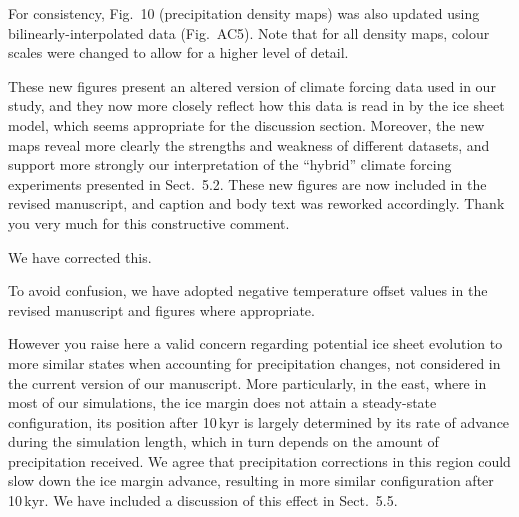 \documentclass[10pt]{article}
\begin{document}
For consistency, Fig.~10 (precipitation density maps) was also updated using bilinearly-interpolated data (Fig.~AC5). Note that for all density maps, colour scales were changed to allow for a higher level of detail.

These new figures present an altered version of climate forcing data used in our study, and they now more closely reflect how this data is read in by the ice sheet model, which seems appropriate for the discussion section. Moreover, the new maps reveal more clearly the strengths and weakness of different datasets, and support more strongly our interpretation of the ``hybrid'' climate forcing experiments presented in Sect.~5.2. These new figures are now included in the revised manuscript, and caption and body text was reworked accordingly. Thank you very much for this constructive comment.


We have corrected this.


To avoid confusion, we have adopted negative temperature offset values in the revised manuscript and figures where appropriate.


However you raise here a valid concern regarding potential ice sheet evolution to more similar states when accounting for precipitation changes, not considered in the current version of our manuscript. More particularly, in the east, where in most of our simulations, the ice margin does not attain a steady-state configuration, its position after 10\,kyr is largely determined by its rate of advance during the simulation length, which in turn depends on the amount of precipitation received. We agree that precipitation corrections in this region could slow down the ice margin advance, resulting in more similar configuration after 10\,kyr. We have included a discussion of this effect in Sect.~5.5.
\end{document}
